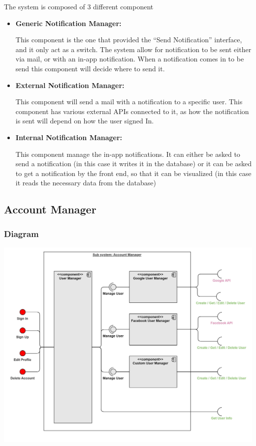 \documentclass{article}
\begin{document}
The system is composed of 3 different component
\begin{itemize}
    \item \textbf{Generic Notification Manager: }

          This component is the one that provided the ``Send Notification'' interface, and it only act as
          a switch. The system allow for notification to be sent either via mail, or with an in-app notification.
          When a notification comes in to be send this component will decide where to send it.
    \item \textbf{External Notification Manager: }

          This component will send a mail with a notification to a specific user.
          This component has various external APIs connected to it, as how the notification is sent will depend on how the user signed In.
    \item \textbf{Internal Notification Manager: }

          This component manage the in-app notifications. It can either be asked to send a notification (in this case it writes it in the database)
          or it can be asked to get a notification by the front end, so that it can be visualized (in this case it reads the necessary data from the database)

\end{itemize}

\subsection{Account Manager}
\subsubsection{Diagram}
\includegraphics[width=\textwidth,height=\textheight,keepaspectratio]{images/component_diagram/account_manager.jpg}
\end{document}
